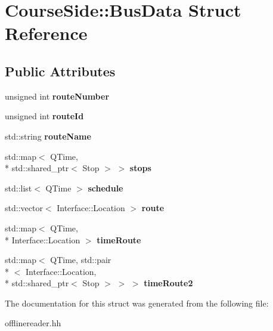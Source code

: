 \hypertarget{structCourseSide_1_1BusData}{\section{Course\-Side\-:\-:Bus\-Data Struct Reference}
\label{structCourseSide_1_1BusData}
}
\subsection*{Public Attributes}
\begin{DoxyCompactItemize}
\item 
\hypertarget{structCourseSide_1_1BusData_a8c3c2eeb8c8f5d5b6e4db16a8c6c3c64}{unsigned int {\bfseries route\-Number}}\label{structCourseSide_1_1BusData_a8c3c2eeb8c8f5d5b6e4db16a8c6c3c64}

\item 
\hypertarget{structCourseSide_1_1BusData_a9e0666f03b1e725b2a32a12025a82b32}{unsigned int {\bfseries route\-Id}}\label{structCourseSide_1_1BusData_a9e0666f03b1e725b2a32a12025a82b32}

\item 
\hypertarget{structCourseSide_1_1BusData_a116234d2c751e1992fa5b7a936246576}{std\-::string {\bfseries route\-Name}}\label{structCourseSide_1_1BusData_a116234d2c751e1992fa5b7a936246576}

\item 
\hypertarget{structCourseSide_1_1BusData_a98c1a5f8617f72d4f57a782717479c92}{std\-::map$<$ Q\-Time, \\*
std\-::shared\-\_\-ptr$<$ Stop $>$ $>$ {\bfseries stops}}\label{structCourseSide_1_1BusData_a98c1a5f8617f72d4f57a782717479c92}

\item 
\hypertarget{structCourseSide_1_1BusData_a9f8e6c907357668ca028e45bbc35be0a}{std\-::list$<$ Q\-Time $>$ {\bfseries schedule}}\label{structCourseSide_1_1BusData_a9f8e6c907357668ca028e45bbc35be0a}

\item 
\hypertarget{structCourseSide_1_1BusData_abe0f3f71154328c2382f6ee5b32f454f}{std\-::vector$<$ Interface\-::\-Location $>$ {\bfseries route}}\label{structCourseSide_1_1BusData_abe0f3f71154328c2382f6ee5b32f454f}

\item 
\hypertarget{structCourseSide_1_1BusData_ae707a4b114f52f4276c8c38e3742733a}{std\-::map$<$ Q\-Time, \\*
Interface\-::\-Location $>$ {\bfseries time\-Route}}\label{structCourseSide_1_1BusData_ae707a4b114f52f4276c8c38e3742733a}

\item 
\hypertarget{structCourseSide_1_1BusData_af7284de0947aa24e91deacae0656b5e7}{std\-::map$<$ Q\-Time, std\-::pair\\*
$<$ Interface\-::\-Location, \\*
std\-::shared\-\_\-ptr$<$ Stop $>$ $>$ $>$ {\bfseries time\-Route2}}\label{structCourseSide_1_1BusData_af7284de0947aa24e91deacae0656b5e7}

\end{DoxyCompactItemize}


The documentation for this struct was generated from the following file\-:\begin{DoxyCompactItemize}
\item 
offlinereader.\-hh\end{DoxyCompactItemize}

